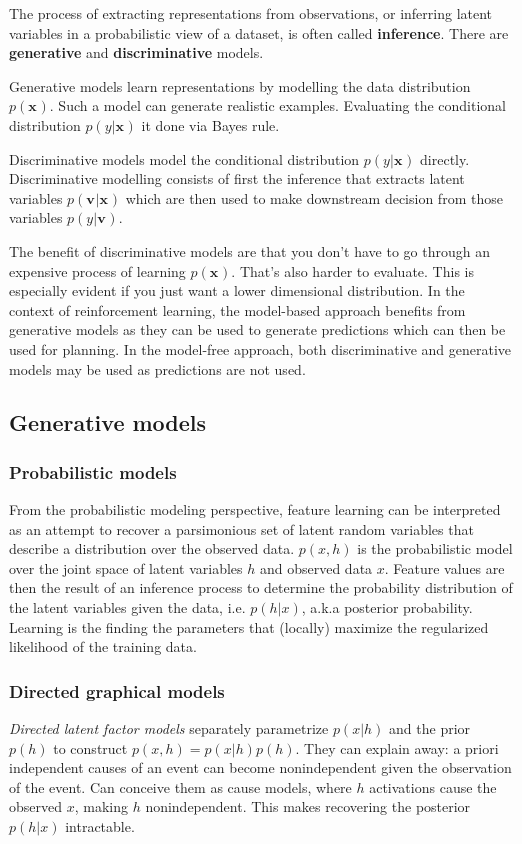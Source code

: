 The process of extracting representations from observations,
or inferring latent variables in a probabilistic view of a dataset,  is often called \textbf{inference}.
There are \textbf{generative} and \textbf{discriminative} models.

Generative models learn representations by modelling the data distribution
$ p(\bm{x}_{})  $. Such a model can generate realistic examples.
Evaluating the conditional distribution $ p (y | \bm{x}_{})  $
it done via Bayes rule.

Discriminative models model the conditional distribution $ p (y | \bm{x}_{})  $
directly.
Discriminative modelling consists of first the inference
that extracts latent variables
$ p(\bm{v}_{}| \bm{x}_{})  $
which are then used to make downstream decision
from those variables $ p (y|\bm{v}_{})  $.

The benefit of discriminative models are that you don't have to go through
an expensive process of learning $ p (\bm{x}_{})  $.
That's also harder to evaluate.
This is especially evident if you just want a lower dimensional distribution.
In the context of reinforcement learning, the model-based approach 
benefits from generative models as they can be used to generate predictions
which can then be used for planning.
In the model-free approach, both discriminative and generative models may be used
as predictions are not used.


\subsection{Generative models}
\subsubsection{Probabilistic models}
\label{subsub-probabilistic-models}
From the probabilistic modeling perspective, feature learning
can be interpreted as an attempt to recover a parsimonious set of latent random
variables that describe a distribution over the observed data.
$ p (x,h)  $ is the probabilistic model over the joint space
of latent variables $ h  $ and observed data $ x  $.
Feature values are then the result of an inference process to determine the probability
distribution of the latent variables given the data, i.e. $ p (h|x)  $,
a.k.a posterior probability.
Learning is the finding the parameters
that (locally) maximize the regularized likelihood of the training data.

\subsubsection{Directed graphical models}
\textit{Directed latent factor models} separately parametrize
$ p (x|h)  $ and the prior $ p (h)  $ to construct
$ p (x,h) = p (x|h) p (h)  $.
They can explain away: a priori independent causes of an event
can become nonindependent given the observation of the event.
Can conceive them as cause models, where $ h  $ activations
cause the observed $ x  $, making $ h  $ nonindependent.
This makes recovering the posterior $ p (h|x)  $ intractable.

